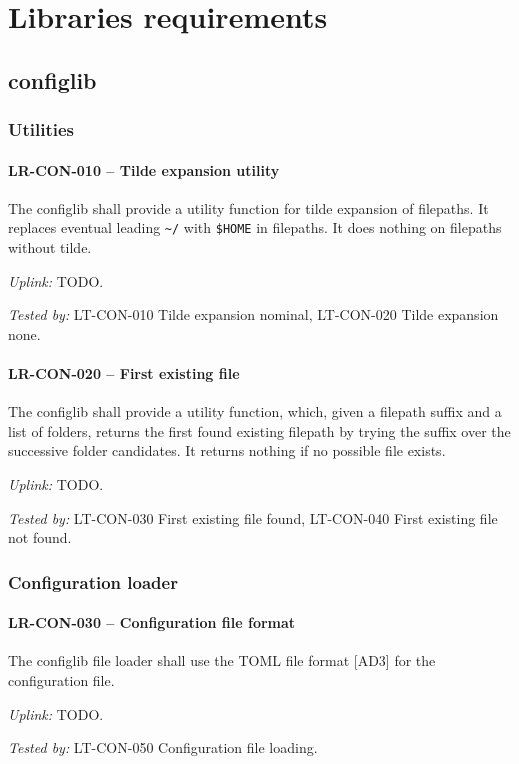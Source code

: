 \section{Libraries requirements}
\subsection{config\textunderscore lib}
\subsubsection{Utilities}
\paragraph{LR-CON-010 -- Tilde expansion utility}
The config\textunderscore lib shall provide a utility function for tilde
expansion of filepaths. It replaces eventual leading \lstinline{~/}
with \lstinline{$HOME} in filepaths. It does nothing on filepaths
without tilde.

\textit{Uplink: } TODO.

\textit{Tested by: } LT-CON-010 Tilde expansion nominal, LT-CON-020 Tilde
expansion none.

\paragraph{LR-CON-020 -- First existing file}
The config\textunderscore lib shall provide a utility function, which,
given a filepath suffix and a list of folders, returns the first found
existing filepath by trying the suffix over the successive folder
candidates. It returns nothing if no possible file exists.

\textit{Uplink: } TODO.

\textit{Tested by: } LT-CON-030 First existing file found, LT-CON-040 First
existing file not found.

\subsubsection{Configuration loader}
\paragraph{LR-CON-030 -- Configuration file format}
The config\textunderscore lib file loader shall use the TOML file format [AD3]
for the configuration file.

\textit{Uplink: } TODO.

\textit{Tested by: } LT-CON-050 Configuration file loading.

